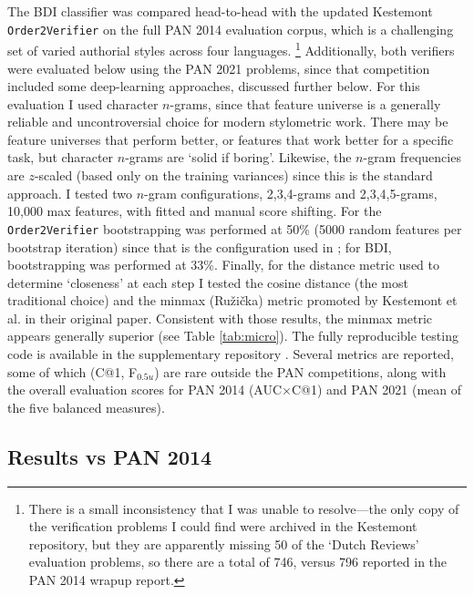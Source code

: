 \documentclass[
    hf
]{ceurart}
\begin{document}
The BDI classifier was compared head-to-head with the updated Kestemont \texttt{Order2Verifier} on
the full PAN 2014 evaluation corpus, which is a challenging set of varied authorial styles across
four languages.%
%
\footnote{ There is a small inconsistency that I was unable to resolve---the only copy of the
    verification problems I could find were archived in the Kestemont repository, but they are
    apparently missing 50 of the `Dutch Reviews' evaluation problems, so there are a total of 746,
    versus 796 reported in the PAN 2014 wrapup report. }
%
Additionally, both verifiers were evaluated below using the PAN 2021 problems, since that competition
included some deep-learning approaches, discussed further below. For this evaluation I used
character $n$-grams, since that feature universe is a generally reliable and uncontroversial choice
for modern stylometric work. There may be feature universes that perform better, or features that
work better for a specific task, but character $n$-grams are `solid if boring'. Likewise, the
$n$-gram frequencies are $z$-scaled (based only on the training variances) since this is the
standard approach. I tested two $n$-gram configurations, 2,3,4-grams and 2,3,4,5-grams, 10,000 max
features, with fitted and manual score shifting. For the \texttt{Order2Verifier} bootstrapping was
performed at 50\% (5000 random features per bootstrap iteration) since that is the configuration
used in \cite{kestemont_caesar}; for BDI, bootstrapping was performed at 33\%. Finally, for the
distance metric used to determine `closeness' at each step I tested the cosine distance (the most
traditional choice) and the minmax (Ružička) metric promoted by Kestemont et al. in their original
paper. Consistent with those results, the minmax metric appears generally superior (see Table
\ref{tab:micro}). The fully reproducible testing code is available in the supplementary repository
\cite{nagy_bdi_2024}. Several metrics are reported, some of which (C@1, F$_{0.5u}$) are rare
outside the PAN competitions, along with the overall evaluation scores for PAN 2014 (AUC$\times$C@1)
and PAN 2021 (mean of the five balanced measures).

\subsection{Results vs PAN 2014}
\end{document}
